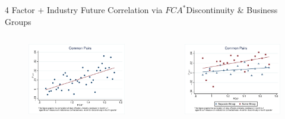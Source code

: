 \documentclass{beamer}
\begin{document}
\begin{frame}{ 4 Factor + Industry Future  Correlation via $ FCA^* $}{Discontinuity \&  Business Groups}
		\begin{columns}
			\begin{figure}   
				\centering
				\includegraphics[width=\linewidth]{"Qmcorr5subsample.eps"}     \end{figure}            
			\begin{figure}
				\centering  
				\includegraphics[width=\linewidth]{"Qmcorr5lrdbgsubsample.eps"}
			\end{figure}
		\end{columns}
		\centering
		
		
		
	\end{frame}
		
\end{document}
